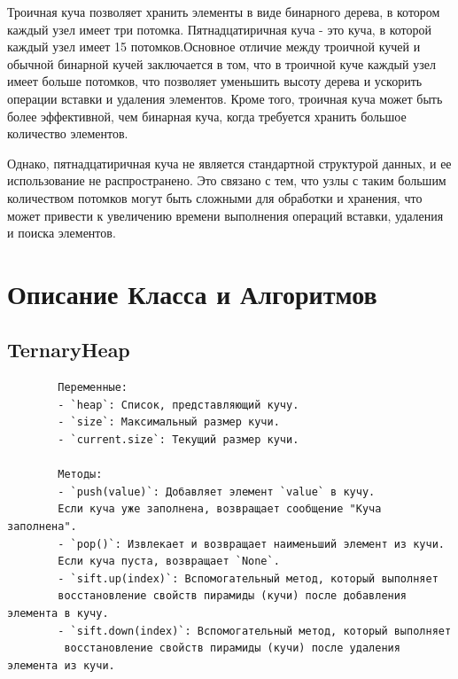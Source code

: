 \documentclass[a4paper, 12pt]{article}
\theoremstyle{definition}
\begin{document}
	Троичная куча позволяет хранить элементы в виде бинарного дерева, в котором каждый узел имеет три потомка. Пятнадцатиричная куча - это куча, в которой каждый узел имеет 15 потомков.Основное отличие между троичной кучей и обычной бинарной кучей заключается в том, что в троичной куче каждый узел имеет больше потомков, что позволяет уменьшить высоту дерева и ускорить операции вставки и удаления элементов. Кроме того, троичная куча может быть более эффективной, чем бинарная куча, когда требуется хранить большое количество элементов. \newline
	
	Однако, пятнадцатиричная куча не является стандартной структурой данных, и ее использование не распространено. Это связано с тем, что узлы с таким большим количеством потомков могут быть сложными для обработки и хранения, что может привести к увеличению времени выполнения операций вставки, удаления и поиска элементов.
	\newpage
	\section{Описание Класса и Алгоритмов}
	\subsection{TernaryHeap}
	\begin{verbatim}
		Переменные:
		- `heap`: Список, представляющий кучу.
		- `size`: Максимальный размер кучи.
		- `current.size`: Текущий размер кучи.
		
		Методы:
		- `push(value)`: Добавляет элемент `value` в кучу.
		Если куча уже заполнена, возвращает сообщение "Куча заполнена".
		- `pop()`: Извлекает и возвращает наименьший элемент из кучи.
		Если куча пуста, возвращает `None`.
		- `sift.up(index)`: Вспомогательный метод, который выполняет 
		восстановление свойств пирамиды (кучи) после добавления элемента в кучу.
		- `sift.down(index)`: Вспомогательный метод, который выполняет
		 восстановление свойств пирамиды (кучи) после удаления элемента из кучи.
	\end{verbatim}
\end{document}

